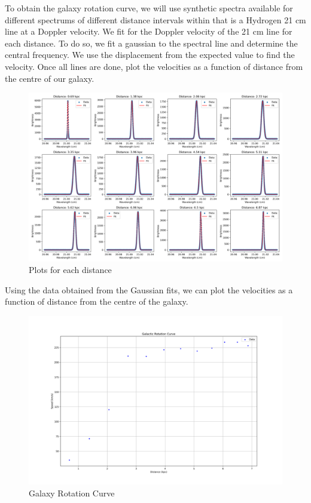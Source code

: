 To obtain the galaxy rotation curve, we will use synthetic spectra available for different spectrums of different distance intervals within that is a Hydrogen 21 cm line at a Doppler velocity. We fit for the Doppler velocity of the 21 cm line for each distance. To do so, we fit a gaussian to the spectral line and determine the central frequency. We use the displacement from the expected value to find the velocity. Once all lines are done, plot the velocities as a function of distance from the centre of our galaxy.

\begin{figure}[H]
	\centering
	\includegraphics[width=\textwidth]{Images/12_files.png}
	\caption{Plots for each distance}
	\label{fig:12_files}
\end{figure}

Using the data obtained from the Gaussian fits, we can plot the velocities as a function of distance from the centre of the galaxy. 

\begin{figure}[H]
	\centering
	\includegraphics[width=\textwidth]{Images/galaxy_rotation_curve.png}
	\caption{Galaxy Rotation Curve}
	\label{fig:galaxy_rotation_curve}
\end{figure}
